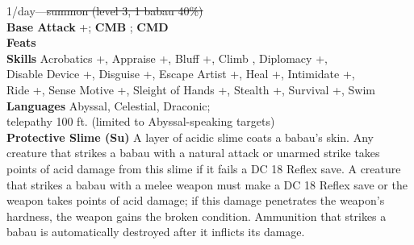 1/day---\sout{summon (level 3, 1 babau 40\%)} \\
\textbf{Base Attack} +\baseattack; \textbf{CMB} \enhancedstat{+\allycmb}; \textbf{CMD} \enhancedstat{\allycmd} \\ 
\textbf{Feats} \feats \\
\textbf{Skills} Acrobatics +\acrobaticsskill, Appraise +\appraiseskill, Bluff +\bluffskill, Climb \enhancedstat{+\climbskill}, Diplomacy +\diplomacyskill, \\ Disable Device +\disabledeviceskill, Disguise +\disguiseskill, Escape Artist +\escapeartistskill, Heal +\healskill, Intimidate +\intimidateskill, \\ Ride +\rideskill, Sense Motive +\sensemotiveskill, Sleight of Hands +\sleightofhandskill, Stealth +\stealthskill, Survival +\survivalskill, Swim \enhancedstat{+\swimskill} \\
\textbf{Languages} Abyssal, Celestial, Draconic; \\ telepathy 100 ft. (limited to Abyssal-speaking targets) \\

\textbf{Protective Slime (Su)} A layer of acidic slime coats a babau's skin. Any creature that strikes a babau with a natural attack or unarmed strike takes  \hspace{1pt} points of acid damage from this slime if it fails a DC 18 Reflex save. A creature that strikes a babau with a melee weapon must make a DC 18 Reflex save or the weapon takes  \hspace{1pt} points of acid damage; if this damage penetrates the weapon's hardness, the weapon gains the broken condition. Ammunition that strikes a babau is automatically destroyed after it inflicts its damage. \\

\newpage
